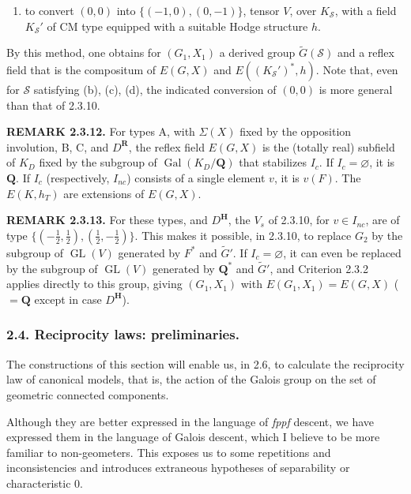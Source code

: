 \documentclass[10pt,a4paper]{article}
\providecommand{\tightlist}{\setlength{\itemsep}{0pt}\setlength{\parskip}{0pt}}
\newcommand{\SourcePage}[2]{\clearpage\setcounter{page}{#2}\typeout{D031_SOURCE_PAGE physical=#1 printed=#2}}
\begin{document}
\SourcePage{28}{274}
\begin{enumerate}
\def\labelenumi{(\alph{enumi})}
\setcounter{enumi}{3}
\tightlist
\item
  to convert \((0,0)\) into \(\{(-1,0),(0,-1)\}\), tensor \(V\), over \(K_{\mathscr S}\), with a field \(K_{\mathscr S}'\) of CM type equipped with a suitable Hodge structure \(h\).
\end{enumerate}

By this method, one obtains for \((G_1,X_1)\) a derived group \(\widetilde G(\mathscr S)\) and a reflex field that is the compositum of \(E(G,X)\) and \(E((K_{\mathscr S}')^*,h)\). Note that, even for \(\mathscr S\) satisfying (b), (c), (d), the indicated conversion of \((0,0)\) is more general than that of 2.3.10.

\textbf{REMARK 2.3.12.} For types A, with \(\Sigma(X)\) fixed by the opposition involution, B, C, and \(D^{\mathbf R}\), the reflex field \(E(G,X)\) is the (totally real) subfield of \(K_D\) fixed by the subgroup of \(\operatorname{Gal}(K_D/\mathbf Q)\) that stabilizes \(I_c\). If \(I_c=\varnothing\), it is \(\mathbf Q\). If \(I_c\) (respectively, \(I_{nc}\)) consists of a single element \(v\), it is \(v(F)\). The \(E(K,h_T)\) are extensions of \(E(G,X)\).

\textbf{REMARK 2.3.13.} For these types, and \(D^{\mathbf H}\), the \(V_s\) of 2.3.10, for \(v\in I_{nc}\), are of type \(\{(-\tfrac12,\tfrac12),(\tfrac12,-\tfrac12)\}\). This makes it possible, in 2.3.10, to replace \(G_2\) by the subgroup of \(\operatorname{GL}(V)\) generated by \(F^*\) and \(\widetilde G'\). If \(I_c=\varnothing\), it can even be replaced by the subgroup of \(\operatorname{GL}(V)\) generated by \(\mathbf Q^*\) and \(\widetilde G'\), and Criterion 2.3.2 applies directly to this group, giving \((G_1,X_1)\) with \(E(G_1,X_1)=E(G,X)\) (\(=\mathbf Q\) except in case \(D^{\mathbf H}\)).

\subsubsection{2.4. Reciprocity laws: preliminaries.}

The constructions of this section will enable us, in 2.6, to calculate the reciprocity law of canonical models, that is, the action of the Galois group on the set of geometric connected components.

Although they are better expressed in the language of \emph{fppf} descent, we have expressed them in the language of Galois descent, which I believe to be more familiar to non-geometers. This exposes us to some repetitions and inconsistencies and introduces extraneous hypotheses of separability or characteristic 0.
\end{document}

